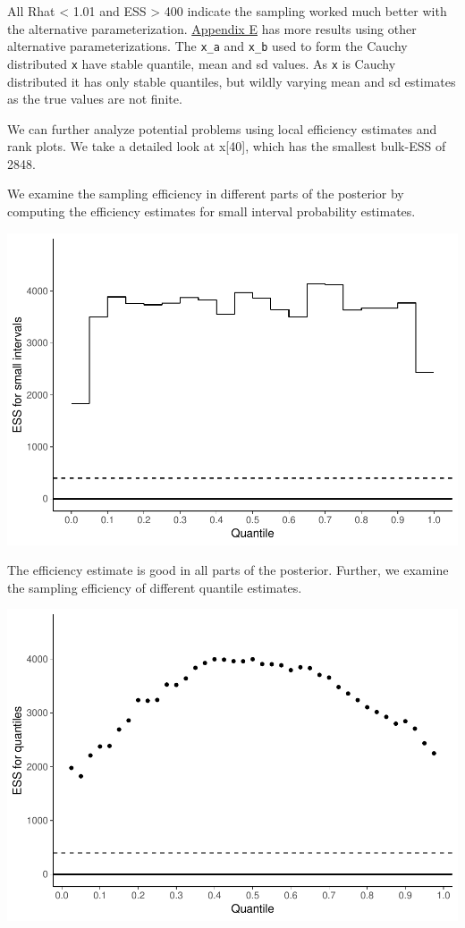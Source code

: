 \documentclass[american,]{article}
\begin{document}
All Rhat \textless{} 1.01 and ESS \textgreater{} 400 indicate the
sampling worked much better with the alternative parameterization.
\protect\hyperlink{AppendixE}{Appendix E} has more results using other
alternative parameterizations. The \texttt{x\_a} and \texttt{x\_b} used
to form the Cauchy distributed \texttt{x} have stable quantile, mean and
sd values. As \texttt{x} is Cauchy distributed it has only stable
quantiles, but wildly varying mean and sd estimates as the true values
are not finite.

We can further analyze potential problems using local efficiency
estimates and rank plots. We take a detailed look at x{[}40{]}, which
has the smallest bulk-ESS of 2848.

We examine the sampling efficiency in different parts of the posterior
by computing the efficiency estimates for small interval probability
estimates.

\includegraphics{graphics/local-ess-fit-alt1-1.pdf}

The efficiency estimate is good in all parts of the posterior. Further,
we examine the sampling efficiency of different quantile estimates.

\includegraphics{graphics/quantile-ess-fit-alt1-1.pdf}
\end{document}

